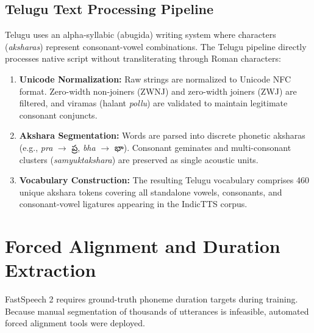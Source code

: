 \documentclass[11pt,a4paper]{article}
\newcommand{\texttelugu}[1]{{\telugufont #1}}
\begin{document}
\subsection{Telugu Text Processing Pipeline}
Telugu uses an alpha-syllabic (abugida) writing system where characters (\textit{aksharas}) represent consonant-vowel combinations. The Telugu pipeline directly processes native script without transliterating through Roman characters:
\begin{enumerate}
    \item \textbf{Unicode Normalization:} Raw strings are normalized to Unicode NFC format. Zero-width non-joiners (ZWNJ) and zero-width joiners (ZWJ) are filtered, and viramas (halant \textit{pollu}) are validated to maintain legitimate consonant conjuncts.
    \item \textbf{Akshara Segmentation:} Words are parsed into discrete phonetic aksharas (e.g., \textit{pra} $\to$ \texttelugu{ప్ర}, \textit{bha} $\to$ \texttelugu{భా}). Consonant geminates and multi-consonant clusters (\textit{samyuktakshara}) are preserved as single acoustic units.
    \item \textbf{Vocabulary Construction:} The resulting Telugu vocabulary comprises 460 unique akshara tokens covering all standalone vowels, consonants, and consonant-vowel ligatures appearing in the IndicTTS corpus.
\end{enumerate}

\section{Forced Alignment and Duration Extraction}

FastSpeech 2 requires ground-truth phoneme duration targets during training. Because manual segmentation of thousands of utterances is infeasible, automated forced alignment tools were deployed.
\end{document}
